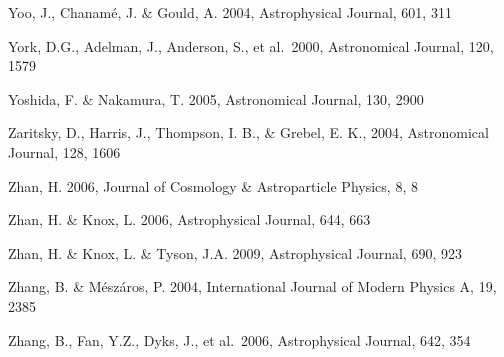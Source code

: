 \documentclass{emulateapj}
\begin{document}
\begin{thebibliography}{}
\bibitem[()]{} Yoo, J., Chanam\'{e}, J. \& Gould, A. 2004, Astrophysical Journal, 601, 311

\bibitem[()]{} York, D.G., Adelman, J., Anderson, S., et al.~2000, Astronomical Journal, 120, 1579

\bibitem[()]{} Yoshida, F. \& Nakamura, T. 2005, Astronomical Journal, 130, 2900

\bibitem[()]{} Zaritsky, D., Harris, J., Thompson, I. B., \& Grebel, E. K., 2004, Astronomical Journal, 128, 1606

\bibitem[()]{} Zhan, H. 2006, Journal of Cosmology \& Astroparticle Physics, 8, 8

\bibitem[()]{} Zhan, H. \& Knox, L. 2006,  Astrophysical Journal, 644, 663

\bibitem[()]{} Zhan, H. \& Knox, L. \& Tyson, J.A. 2009,  Astrophysical Journal, 690, 923

\bibitem[()]{} Zhang, B. \& M\'{e}sz\'{a}ros, P. 2004, International Journal of Modern Physics A, 19, 2385

\bibitem[()]{} Zhang, B., Fan, Y.Z., Dyks, J., et al.~2006,  Astrophysical Journal, 642, 354

\end{thebibliography}
\end{document}

